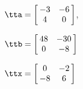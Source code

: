 {$\tta = \left[\hskip -3pt \begin{array}{cc} -3&-6 \\    4&0 \end{array}\hskip -3pt \right] $, 

$\ttb=\left[\hskip -3pt \begin{array}{cc} 48&-30\\    0&-8  \end{array}\hskip -3pt \right] $}
{$\ttx=\left[\hskip -3pt \begin{array}{cc} 0&-2\\    -8&6  \end{array}\hskip -3pt \right] $}
